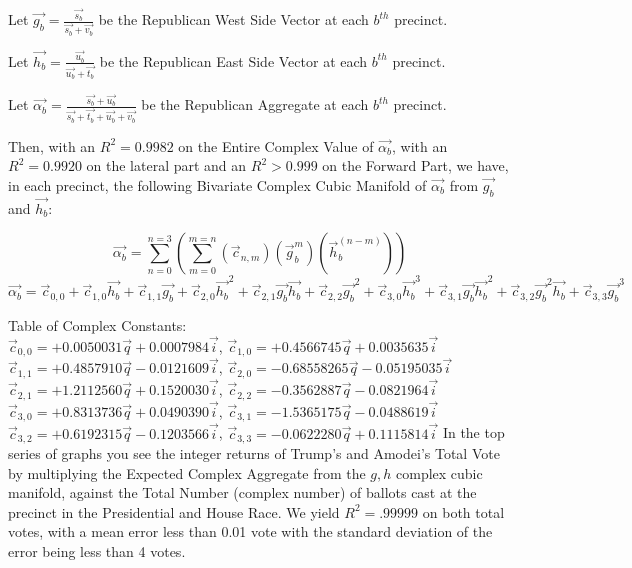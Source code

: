 \documentclass[preprint,13pt]{elsarticle}
\begin{document}
Let $\vec{g_{b}}=\frac{\vec{s_{b}}}{\vec{s_{b}}+\vec{v_{b}}}$ be the Republican West Side Vector at each $b^{th}$ precinct.

Let $\vec{h_{b}}=\frac{\vec{u_{b}}}{\vec{u_{b}}+\vec{t_{b}}}$ be the Republican East Side Vector at each $b^{th}$ precinct.

Let $\vec{\alpha_{b}}=\frac{\vec{s_{b}}+\vec{u_{b}}}{\vec{s_{b}}+\vec{t_{b}}+\vec{u_{b}}+\vec{v_{b}}}$ be the Republican Aggregate at each $b^{th}$ precinct.

Then, with an $R^2=0.9982$ on the Entire Complex Value of $\vec{\alpha_{b}}$, with an $R^2=0.9920$ on the lateral part and an $R^2>0.999$ on the Forward Part, we have, in each precinct, the following Bivariate Complex Cubic Manifold of $\vec{\alpha_{b}}$ from $\vec{g_{b}}$ and $\vec{h_{b}}$:

$$\vec{\alpha_{b}}=\sum_{n=0}^{n=3}\left(\sum_{m=0}^{m=n}\left(\vec{c}_{n,m}\right)\left(\vec{g}_{b}^m\right)\left(\vec{h}_{b}^{(n-m)}\right) \right)$$
$$\vec{\alpha_{b}}=\vec{c}_{0,0}+\vec{c}_{1,0}\vec{h_{b}}+\vec{c}_{1,1}\vec{g_{b}}+\vec{c}_{2,0}\vec{h_{b}}^2+\vec{c}_{2,1}\vec{g_{b}}\vec{h_{b}}+\vec{c}_{2,2}\vec{g_{b}}^2+\vec{c}_{3,0}\vec{h_{b}}^3+\vec{c}_{3,1}\vec{g_{b}}\vec{h_{b}}^2+\vec{c}_{3,2}\vec{g_{b}}^2\vec{h_{b}}+\vec{c}_{3,3}\vec{g_{b}}^3$$

Table of Complex Constants:\\
$\vec{c}_{0,0}=+0.0050031\vec{q}+0.0007984\vec{i}$, $\vec{c}_{1,0}=+0.4566745\vec{q}+0.0035635\vec{i}$\\
$\vec{c}_{1,1}=+0.4857910\vec{q}-0.0121609\vec{i}$, $\vec{c}_{2,0}=-0.68558265\vec{q}-0.05195035\vec{i}$\\
$\vec{c}_{2,1}=+1.2112560\vec{q}+0.1520030\vec{i}$, $\vec{c}_{2,2}=-0.3562887\vec{q}-0.0821964\vec{i}$\\
$\vec{c}_{3,0}=+0.8313736\vec{q}+0.0490390\vec{i}$, $\vec{c}_{3,1}=-1.5365175\vec{q}-0.0488619\vec{i}$\\
$\vec{c}_{3,2}=+0.6192315\vec{q}-0.1203566\vec{i}$, $\vec{c}_{3,3}=-0.0622280\vec{q}+0.1115814\vec{i}$
\newpage
In the top series of graphs you see the integer returns of Trump's and Amodei's Total Vote by multiplying the Expected Complex Aggregate from the $g,h$ complex cubic manifold, against the Total Number (complex number) of ballots cast at the precinct in the Presidential and House Race. We yield $R^2=.99999$ on both total votes, with a mean error less than 0.01 vote with the standard deviation of the error being less than 4 votes. 
\end{document}

